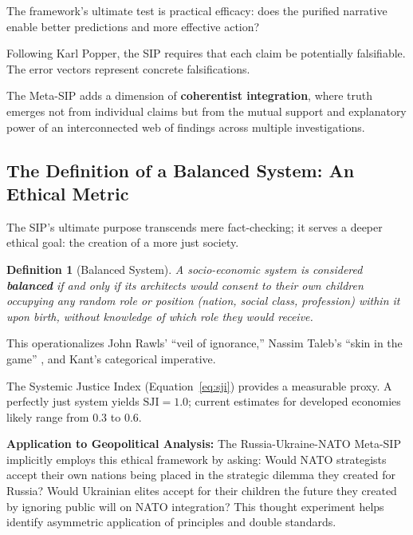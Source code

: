 \documentclass[11pt,a4paper]{article}
\newtheorem{definition}{Definition}[section]
\begin{document}
\begin{small}
\begin{description}[style=nextline]
\item[\textbf{Pragmatic Theory:}] The framework's ultimate test is practical efficacy: does the purified narrative enable better predictions and more effective action?

\item[\textbf{Falsificationist Epistemology:}] Following Karl Popper, the SIP requires that each claim be potentially falsifiable. The error vectors represent concrete falsifications.
\end{description}

The Meta-SIP adds a dimension of \textbf{coherentist integration}, where truth emerges not from individual claims but from the mutual support and explanatory power of an interconnected web of findings across multiple investigations.

\subsection{The Definition of a Balanced System: An Ethical Metric}

The SIP's ultimate purpose transcends mere fact-checking; it serves a deeper ethical goal: the creation of a more just society.

\begin{definition}[Balanced System]
A socio-economic system is considered \textbf{balanced} if and only if its architects would consent to their own children occupying any random role or position (nation, social class, profession) within it upon birth, without knowledge of which role they would receive.
\end{definition}

This operationalizes John Rawls' ``veil of ignorance,'' Nassim Taleb's ``skin in the game'' \citep{Taleb2012}, and Kant's categorical imperative.

The Systemic Justice Index (Equation~\ref{eq:sji}) provides a measurable proxy. A perfectly just system yields $\text{SJI} = 1.0$; current estimates for developed economies likely range from $0.3$ to $0.6$.

\textbf{Application to Geopolitical Analysis:} The Russia-Ukraine-NATO Meta-SIP implicitly employs this ethical framework by asking: Would NATO strategists accept their own nations being placed in the strategic dilemma they created for Russia? Would Ukrainian elites accept for their children the future they created by ignoring public will on NATO integration? This thought experiment helps identify asymmetric application of principles and double standards.


\end{small}
\end{document}
